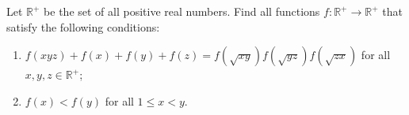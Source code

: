 Let $\mathbb{R}^+$ be the set of all positive real numbers. Find all functions $f : \mathbb{R}^+ \to \mathbb{R}^+$ that satisfy the following conditions:
\begin{enumerate}
\item[(i)] $f(xyz) + f(x) + f(y) + f(z) = f(\sqrt{xy})f(\sqrt{yz})f(\sqrt{zx})$ for all $x, y, z \in \mathbb{R}^+$;
\item[(ii)] $f(x) < f(y)$ for all $1 \leq x < y$.
\end{enumerate}
